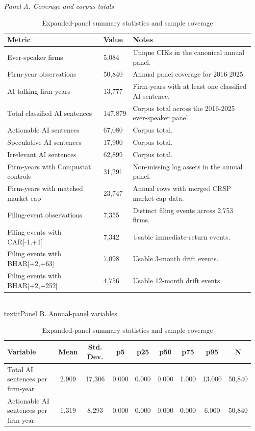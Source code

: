 \begin{table}[!htbp]
\centering
\scriptsize
\caption{Expanded-panel summary statistics and sample coverage}
\textit{Panel A. Coverage and corpus totals}\\
\begin{tabular}{p{}p{}p{}}
\hline
Metric & Value & Notes \\
\hline
Ever-speaker firms & 5,084 & Unique CIKs in the canonical annual panel. \\
Firm-year observations & 50,840 & Annual panel coverage for 2016-2025. \\
AI-talking firm-years & 13,777 & Firm-years with at least one classified AI sentence. \\
Total classified AI sentences & 147,879 & Corpus total across the 2016-2025 ever-speaker panel. \\
Actionable AI sentences & 67,080 & Corpus total. \\
Speculative AI sentences & 17,900 & Corpus total. \\
Irrelevant AI sentences & 62,899 & Corpus total. \\
Firm-years with Compustat controls & 31,291 & Non-missing log assets in the annual panel. \\
Firm-years with matched market cap & 23,747 & Annual rows with merged CRSP market-cap data. \\
Filing-event observations & 7,355 & Distinct filing events across 2,753 firms. \\
Filing events with CAR[-1,+1] & 7,342 & Usable immediate-return events. \\
Filing events with BHAR[+2,+63] & 7,098 & Usable 3-month drift events. \\
Filing events with BHAR[+2,+252] & 4,756 & Usable 12-month drift events. \\
\hline
\end{tabular}
\vspace{0.4em}
\\textit{Panel B. Annual-panel variables}\\
\begin{tabular}{lcccccccc}
\hline
Variable & Mean & Std. Dev. & p5 & p25 & p50 & p75 & p95 & N \\
\hline
Total AI sentences per firm-year & 2.909 & 17.306 & 0.000 & 0.000 & 0.000 & 1.000 & 13.000 & 50,840 \\
Actionable AI sentences per firm-year & 1.319 & 8.293 & 0.000 & 0.000 & 0.000 & 0.000 & 6.000 & 50,840 \\

\end{tabular}
\end{table}
